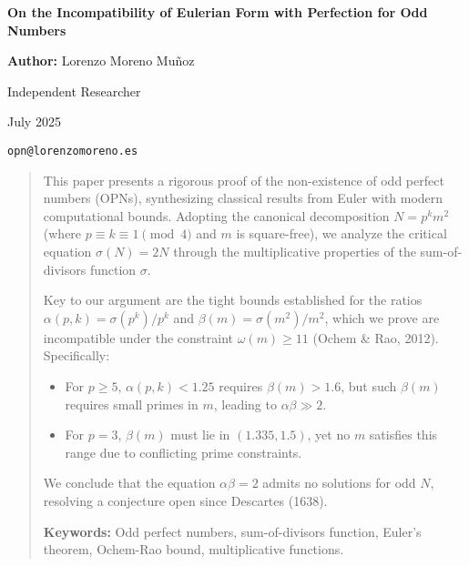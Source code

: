 \documentclass[11pt,a4paper]{article}
\begin{document}
\begin{titlepage}
\begin{center}
\vspace*{2cm}

{\Huge \textbf{On the Incompatibility of Eulerian Form with Perfection for Odd Numbers}}

\vspace{2cm}

{\large \textbf{Author:} Lorenzo Moreno Muñoz}

\vspace{0.5cm}

{\large Independent Researcher}

\vspace{0.5cm}

{\large July 2025}

\vspace{0.5cm}

{\large \texttt{opn@lorenzomoreno.es}}

\vfill

\end{center}
\end{titlepage}

\begin{abstract}
This paper presents a rigorous proof of the non-existence of odd perfect numbers (OPNs), synthesizing classical results from Euler with modern computational bounds. Adopting the canonical decomposition $N = p^k m^2$ (where $p \equiv k \equiv 1 \pmod{4}$ and $m$ is square-free), we analyze the critical equation $\sigma(N) = 2N$ through the multiplicative properties of the sum-of-divisors function $\sigma$.

Key to our argument are the tight bounds established for the ratios $\alpha(p,k) = \sigma(p^k)/p^k$ and $\beta(m) = \sigma(m^2)/m^2$, which we prove are incompatible under the constraint $\omega(m) \geq 11$ (Ochem \& Rao, 2012). Specifically:
\begin{itemize}
\item For $p \geq 5$, $\alpha(p,k) < 1.25$ requires $\beta(m) > 1.6$, but such $\beta(m)$ requires small primes in $m$, leading to $\alpha \beta \gg 2$.
\item For $p = 3$, $\beta(m)$ must lie in $(1.335, 1.5)$, yet no $m$ satisfies this range due to conflicting prime constraints.
\end{itemize}

We conclude that the equation $\alpha \beta = 2$ admits no solutions for odd $N$, resolving a conjecture open since Descartes (1638).

\textbf{Keywords:} Odd perfect numbers, sum-of-divisors function, Euler's theorem, Ochem-Rao bound, multiplicative functions.
\end{abstract}
\end{document}
